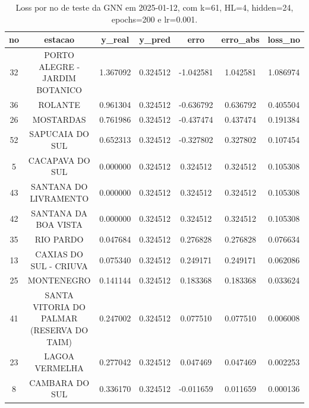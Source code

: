 \begin{table}[h]
\centering
\caption{Loss por no de teste da GNN em 2025-01-12, com k=61, HL=4, hidden=24, epochs=200 e lr=0.001.}
\label{tab:gnn_loss_k61_hl4_h24_e200_d20250112}
\begin{tabular}{ccccccc}
\toprule
no & estacao & y\_real & y\_pred & erro & erro\_abs & loss\_no \\
\midrule
32 & PORTO ALEGRE - JARDIM BOTANICO & 1.367092 & 0.324512 & -1.042581 & 1.042581 & 1.086974 \\
36 & ROLANTE & 0.961304 & 0.324512 & -0.636792 & 0.636792 & 0.405504 \\
26 & MOSTARDAS & 0.761986 & 0.324512 & -0.437474 & 0.437474 & 0.191384 \\
52 & SAPUCAIA DO SUL & 0.652313 & 0.324512 & -0.327802 & 0.327802 & 0.107454 \\
5 & CACAPAVA DO SUL & 0.000000 & 0.324512 & 0.324512 & 0.324512 & 0.105308 \\
43 & SANTANA DO LIVRAMENTO & 0.000000 & 0.324512 & 0.324512 & 0.324512 & 0.105308 \\
42 & SANTANA DA BOA VISTA & 0.000000 & 0.324512 & 0.324512 & 0.324512 & 0.105308 \\
35 & RIO PARDO & 0.047684 & 0.324512 & 0.276828 & 0.276828 & 0.076634 \\
13 & CAXIAS DO SUL - CRIUVA & 0.075340 & 0.324512 & 0.249171 & 0.249171 & 0.062086 \\
25 & MONTENEGRO & 0.141144 & 0.324512 & 0.183368 & 0.183368 & 0.033624 \\
41 & SANTA VITORIA DO PALMAR (RESERVA DO TAIM) & 0.247002 & 0.324512 & 0.077510 & 0.077510 & 0.006008 \\
23 & LAGOA VERMELHA & 0.277042 & 0.324512 & 0.047469 & 0.047469 & 0.002253 \\
8 & CAMBARA DO SUL & 0.336170 & 0.324512 & -0.011659 & 0.011659 & 0.000136 \\
\bottomrule
\end{tabular}
\end{table}
